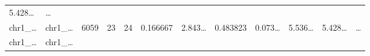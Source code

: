 \documentclass[
]{article}
\begin{document}
\begin{longtable}[]{@{}llllllllllll@{}}
\begin{minipage}[t]{0.06\columnwidth}
5.428\ldots{}\strut
\end{minipage} & \begin{minipage}[t]{0.02\columnwidth}\raggedright
\ldots{}\strut
\end{minipage}\tabularnewline
\begin{minipage}[t]{0.06\columnwidth}\raggedright
chr1\_\ldots{}\strut
\end{minipage} & \begin{minipage}[t]{0.06\columnwidth}\raggedright
chr1\_\ldots{}\strut
\end{minipage} & \begin{minipage}[t]{0.06\columnwidth}\raggedright
6059\strut
\end{minipage} & \begin{minipage}[t]{0.06\columnwidth}\raggedright
23\strut
\end{minipage} & \begin{minipage}[t]{0.06\columnwidth}\raggedright
24\strut
\end{minipage} & \begin{minipage}[t]{0.06\columnwidth}\raggedright
0.166667\strut
\end{minipage} & \begin{minipage}[t]{0.08\columnwidth}\raggedright
2.843\ldots{}\strut
\end{minipage} & \begin{minipage}[t]{0.06\columnwidth}\raggedright
0.483823\strut
\end{minipage} & \begin{minipage}[t]{0.06\columnwidth}\raggedright
0.073\ldots{}\strut
\end{minipage} & \begin{minipage}[t]{0.09\columnwidth}\raggedright
5.536\ldots{}\strut
\end{minipage} & \begin{minipage}[t]{0.06\columnwidth}\raggedright
5.428\ldots{}\strut
\end{minipage} & \begin{minipage}[t]{0.02\columnwidth}\raggedright
\ldots{}\strut
\end{minipage}\tabularnewline
\begin{minipage}[t]{0.06\columnwidth}\raggedright
chr1\_\ldots{}\strut
\end{minipage} & \begin{minipage}[t]{0.06\columnwidth}\raggedright
chr1\_\ldots{}\strut
\end{minipage} & \begin{minipage}[t]{0.06\columnwidth}\raggedright

\end{minipage}
\end{longtable}
\end{document}

